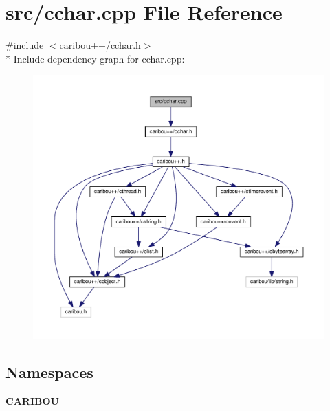 \section{src/cchar.cpp File Reference}
\label{cchar_8cpp}
{\ttfamily \#include $<$caribou++/cchar.\-h$>$}\\*
Include dependency graph for cchar.\-cpp\-:\nopagebreak
\begin{figure}[H]
\begin{center}
\leavevmode
\includegraphics[width=350pt]{cchar_8cpp__incl}
\end{center}
\end{figure}
\subsection*{Namespaces}
\begin{DoxyCompactItemize}
\item 
{\bf C\-A\-R\-I\-B\-O\-U}
\end{DoxyCompactItemize}

